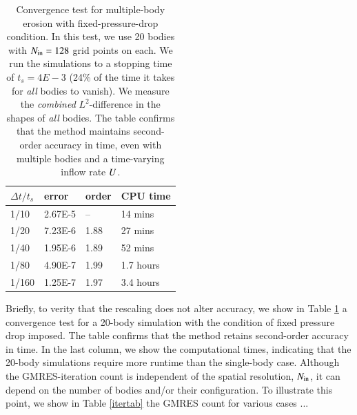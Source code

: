 \documentclass[preprint, 10pt]{elsarticle}
\begin{document}
\begin{table}%
\begin{center}
\caption{Convergence test for multiple-body erosion with fixed-pressure-drop condition. In this test, we use 20 bodies with $N_{\mathrm{in}} = 128$ grid points on each. We run the simulations to a stopping time of $t_s = 4E-3$ (24\% of the time it takes for {\em all} bodies to vanish). We measure the {\em combined} $L^2$-difference in the shapes of {\em all} bodies. The table confirms that the method maintains second-order accuracy in time, even with multiple bodies and a time-varying inflow rate $U$.
}
\vspace{0.3 pc}
\label{convtab}
\begin{tabular}{l l l l}
\hline
\hspace{0.0pc} $\Delta t/t_s$
\hspace{0.5pc} & error 
\hspace{0.5pc} & order
\hspace{0.5pc} & CPU time \\
\hline
%
1/10     	& 2.67E-5  	& --        	& 14 mins  	\\
1/20     	& 7.23E-6  	& 1.88 	& 27 mins  	\\
1/40     	& 1.95E-6  	& 1.89 	& 52 mins  	\\
1/80     	& 4.90E-7  	& 1.99 	& 1.7 hours	\\
1/160     	& 1.25E-7  	& 1.97  	& 3.4 hours	\\
%
\hline
\end{tabular}
\end{center}
\end{table}

Briefly, to verity that the rescaling does not alter accuracy, we show in Table \ref{convtab} a convergence test for a 20-body simulation with the condition of fixed pressure drop imposed. The table confirms that the method retains second-order accuracy in time. In the last column, we show the computational times, indicating that the 20-body simulations require more runtime than the single-body case. Although the GMRES-iteration count is independent of the spatial resolution, $N_{\mathrm{in}}$, it can depend on the number of bodies and/or their configuration. To illustrate this point, we show in Table \ref{itertab} the GMRES count for various cases ...
\end{document}
